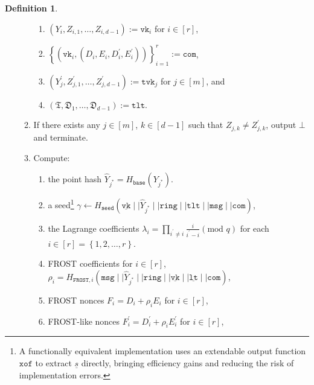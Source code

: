\documentclass[11pt]{article}
\theoremstyle{definition}
\newtheorem{definition}[definition]{Definition}
\newcommand{\vk}{\texttt{vk}}
\newcommand{\lt}{\texttt{lt}}
\newcommand{\tlt}{\texttt{tlt}}
\newcommand{\tvk}{\texttt{tvk}}
\newcommand{\ring}{\texttt{ring}}
\newcommand{\VK}{\underline{\texttt{vk}}}
\newcommand{\LT}{\underline{\texttt{lt}}}
\newcommand{\seed}{\texttt{seed}}
\newcommand{\com}{\texttt{com}}
\newcommand{\msg}{\texttt{msg}}
\newcommand{\FROST}{\texttt{FROST}}
\begin{document}
\begin{definition}
\begin{enumerate}
\begin{enumerate}
\begin{enumerate}
\item $(Y_i, Z_{i,1}, \ldots, Z_{i,d-1}) := \vk_i$ for $i \in [r]$,
\item $\left\{(\vk_i, (D_i, E_i, D_i^\prime, E_i^\prime))\right\}_{i=1}^{r} := \texttt{com}$, 
\item $(Y^\prime_j, Z_{j,1}^\prime, \ldots, Z_{j,d-1}^\prime) := \tvk_j$ for $j \in [m]$, and
\item $(\mathfrak{T}, \mathfrak{D}_1, \ldots, \mathfrak{D}_{d-1}) := \tlt$.
\end{enumerate}

\item If there exists any $j \in [m]$, $k \in [d-1]$ such that $Z_{j,k} \neq Z^\prime_{j,k}$, output $\bot$ and terminate.


\item Compute:
\begin{enumerate}
\item the point hash $\widehat{Y}_{j^*} = H_{\texttt{base}}(Y_{j^*})$.
\item a seed\footnote{A functionally equivalent implementation uses an extendable output function $\texttt{xof}$ to extract $\underline{s}$ directly, bringing efficiency gains and reducing the risk of implementation errors.} $\gamma \leftarrow H_{\seed}(\VK \mid \mid \widehat{Y}_{j^*} \mid \mid \ring \mid \mid \tlt \mid \mid \msg \mid \mid \texttt{com})$, 
\item the Lagrange coefficients $\lambda_i = \prod_{i^\prime \neq i} \frac{i}{i^\prime-i} (\text{mod }q)$ for each $i \in [r] = \left\{1,2,\ldots,r\right\}$.

\item FROST coefficients for $i \in [r]$, $\rho_i = H_{\FROST,i}(\msg \mid \mid \widehat{Y}_{j^*} \mid \mid \ring \mid \mid \VK \mid \mid \LT \mid \mid \com)$,



\item FROST nonces $F_i = D_i + \rho_i E_i$ for $i \in [r]$,
\item FROST-like nonces $F^\prime_i = D^\prime_i + \rho_i E^\prime_i$ for $i \in [r]$,


\end{enumerate}
\end{enumerate}
\end{enumerate}
\end{definition}
\end{document}
